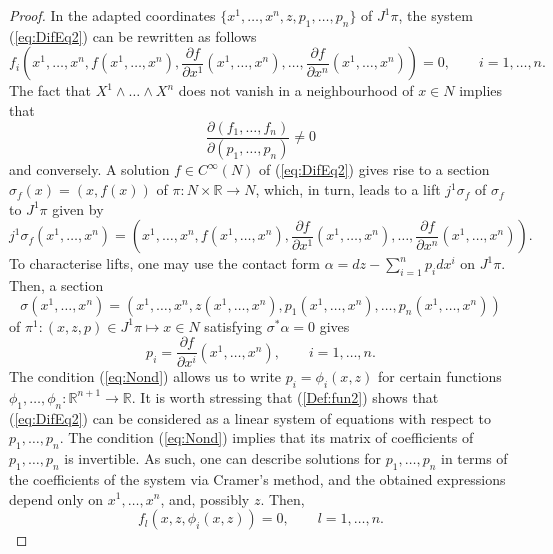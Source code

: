 \documentclass[12pt]{article}
\theoremstyle{plain}
\theoremstyle{definition}
\numberwithin{equation}{section}
\begin{document}
\begin{proof}
 In the adapted coordinates $\{x^1,\ldots,x^n,z,p_1,\ldots,p_n\}$ of $J^1\pi$, the system (\ref{eq:DifEq2}) can be rewritten as follows
$$
f_i\left(x^1,\ldots,x^n,f(x^1,\ldots,x^n),\frac{\partial f}{\partial x^1}(x^1,\ldots,x^n),\ldots,\frac{\partial f}{\partial x^n}(x^1,\ldots,x^n)\right)=0,\qquad i=1,\ldots,n.
$$
The fact that $X^1\wedge\ldots\wedge X^n$ does not vanish in a neighbourhood of $x\in N$ implies that
\begin{equation}\label{eq:Nond}
\frac{\partial (f_1,\ldots,f_n)}{\partial (p_{1},\ldots,p_{n})}\neq0
\end{equation}
and conversely. %
 A solution $f\in C^\infty(N)$ of (\ref{eq:DifEq2}) gives rise to a section $\sigma_f(x)=(x,f(x))$ of $\pi:N\times \mathbb{R}\rightarrow N$, which, in turn, leads to a lift $j^1\sigma_f$ of $\sigma_f$ to $J^1\pi$ given by
$$
j^1\sigma_f(x^1,\ldots,x^n)=\left(x^1,\ldots,x^n,f(x^1,\ldots,x^n),\frac{\partial f}{\partial x^1}(x^1,\ldots,x^n),\ldots,\frac{\partial f}{\partial x^n}(x^1,\ldots,x^n)\right).
$$
To characterise lifts, one may use the contact form $\alpha=dz-\sum_{i=1}^np_idx^i$ on $J^1\pi$. Then, a section 
$$
\sigma(x^1,\ldots,x^n)=(x^1,\ldots,x^n,z(x^1,\ldots,x^n),p_1(x^1,\ldots,x^n),\ldots,p_n(x^1,\ldots,x^n))
$$
of $\pi^1:(x,z,p)\in J^1\pi\mapsto x\in N$ satisfying
$\sigma^*\alpha=0$ gives
$$
p_i=\frac{\partial f}{\partial x^i}(x^1,\ldots,x^n),\qquad i=1,\ldots,n.
$$
The condition (\ref{eq:Nond}) allows us to write $p_i=\phi_i(x,z)$ for certain functions $\phi_1,\ldots,\phi_n:\mathbb{R}^{n+1}\rightarrow \mathbb{R}$. It is worth stressing that (\ref{Def:fun2}) shows that (\ref{eq:DifEq2}) can be considered as a linear system of equations with respect to $p_1,\ldots,p_n$. The condition (\ref{eq:Nond}) implies that its matrix of coefficients of $p_1,\ldots,p_n$ is invertible. As such, one can describe solutions for $p_1,\ldots,p_n$ in terms of the coefficients of the system via Cramer's method, and the obtained expressions depend only on $x^1,\ldots,x^n$, and, possibly $z$. Then,
\begin{equation}\label{eq:Expr}
f_l(x,z,\phi_i(x,z))=0,\qquad l=1,\ldots,n.
\end{equation}


\end{proof}
\end{document}
